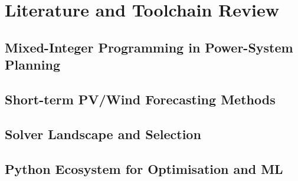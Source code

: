 \newpage
\section{Literature and Toolchain Review}

\subsection{Mixed-Integer Programming in Power-System Planning}

\subsection{Short-term PV/Wind Forecasting Methods}

\subsection{Solver Landscape and Selection}

\subsection{Python Ecosystem for Optimisation and ML}

\newpage
